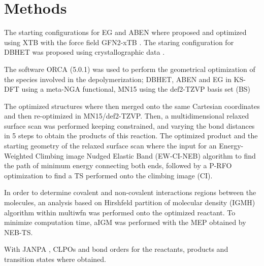 \section{Methods}

The starting configurations for EG and ABEN where proposed and optimized using XTB \cite{Bannwarth2021} with the force field GFN2-xTB \cite{Bannwarth2019}. The staring configuration for DBHET was proposed using crystallographic data \cite{Daubeny1954}.

The software ORCA (5.0.1) \cite{Neese2020} was used to perform the geometrical optimization of the species involved in the depolymerization; DBHET, ABEN and EG in KS-DFT using a meta-NGA functional, MN15 \cite{Yu2016a} using the def2-TZVP basis set (BS)

The optimized structures where then merged onto the same Cartesian coordinates and then re-optimized in MN15/def2-TZVP. Then, a multidimensional relaxed surface scan was performed keeping constrained, and varying the bond distances in 5 steps to obtain the products of this reaction. The optimized product and the starting geometry of the relaxed surface scan where the input for an Energy-Weighted Climbing image Nudged Elastic Band (EW-CI-NEB) \cite{Asgeirsson2021} algorithm to find the path of minimum energy connecting both ends, followed by a P-RFO optimization to find a TS performed onto the climbing image (CI).

In order to determine covalent and non-covalent interactions regions between the molecules, an analysis based on Hirshfeld partition of molecular density (IGMH) algorithm within multiwfn was performed \cite{Lu2021} onto the optimized reactant. To minimize computation time, aIGM was performed with the MEP obtained by NEB-TS.

With JANPA \cite{Nikolaienko2014}, CLPOs and bond orders for the reactants, products and transition states where obtained.